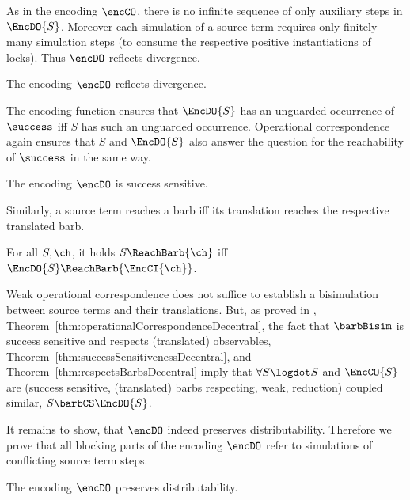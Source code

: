 \documentclass[copyright,creativecommons]{eptcs}
\begin{document}
As in the encoding $ \encCO $, there is no infinite sequence of only auxiliary steps in $ \EncDO{S} $.
Moreover each simulation of a source term requires only finitely many simulation steps (to consume the respective positive instantiations of locks). Thus $ \encDO $ reflects divergence.

\begin{theorem}
	The encoding $ \encDO $ reflects divergence.
	\label{thm:divergenceReflectionDecentral}
\end{theorem}

The encoding function ensures that $ \EncDO{S} $ has an unguarded occurrence of $ \success $ iff $ S $ has such an unguarded occurrence. Operational correspondence again ensures that $ S $ and $ \EncDO{S} $ also answer the question for the reachability of $ \success $ in the same way.

\begin{theorem}
	The encoding $ \encDO $ is success sensitive.
	\label{thm:successSensitivenessDecentral}
\end{theorem}

Similarly, a source term reaches a barb iff its translation reaches the respective translated barb.

\begin{theorem}
	For all $ S, \ch $, it holds $ S\ReachBarb{\ch} $ iff $ \EncDO{S}\ReachBarb{\EncCI{\ch}} $.
	\label{thm:respectsBarbsDecentral}
\end{theorem}

Weak operational correspondence does not suffice to establish a bisimulation between source terms and their translations.
But, as proved in \cite{petersGlabbeek15}, Theorem~\ref{thm:operationalCorrespondenceDecentral}, the fact that $ \barbBisim $ is success sensitive and respects (translated) observables, Theorem~\ref{thm:successSensitivenessDecentral}, and Theorem~\ref{thm:respectsBarbsDecentral} imply that $ \forall S\logdot S $ and $ \EncCO{S} $ are (success sensitive, (translated) barbs respecting, weak, reduction) coupled similar, \ie $ S \barbCS \EncDO{S} $.

It remains to show, that $ \encDO $ indeed preserves distributability. Therefore we prove that all blocking parts of the encoding $ \encDO $ refer to simulations of conflicting source term steps.

\begin{theorem}
	The encoding $ \encDO $ preserves distributability.
	\label{thm:distributability}
\end{theorem}
\end{document}
